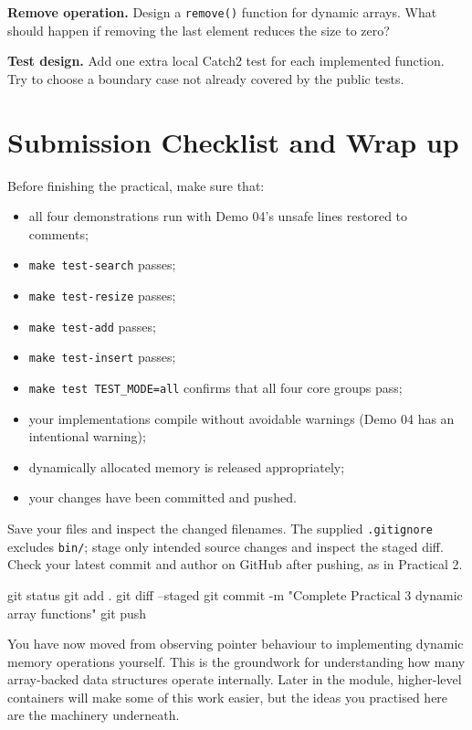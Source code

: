 \documentclass{csc2059practical}
\begin{document}
\begin{challengebox}
\textbf{Remove operation.} Design a \texttt{remove()} function for dynamic arrays. What should happen if removing the last element reduces the size to zero?
\end{challengebox}

\begin{challengebox}
\textbf{Test design.} Add one extra local Catch2 test for each implemented function. Try to choose a boundary case not already covered by the public tests.
\end{challengebox}

\section{Submission Checklist and Wrap up}

Before finishing the practical, make sure that:

\begin{itemize}
  \item all four demonstrations run with Demo 04's unsafe lines restored to comments;
  \item \texttt{make test-search} passes;
  \item \texttt{make test-resize} passes;
  \item \texttt{make test-add} passes;
  \item \texttt{make test-insert} passes;
  \item \texttt{make test TEST\_MODE=all} confirms that all four core groups pass;
  \item your implementations compile without avoidable warnings (Demo 04 has an intentional warning);
  \item dynamically allocated memory is released appropriately;
  \item your changes have been committed and pushed.
\end{itemize}

Save your files and inspect the changed filenames. The supplied \texttt{.gitignore} excludes \texttt{bin/}; stage only intended source changes and inspect the staged diff. Check your latest commit and author on GitHub after pushing, as in Practical 2.

\begin{bashcode}
git status
git add .
git diff --staged
git commit -m "Complete Practical 3 dynamic array functions"
git push
\end{bashcode}

\begin{wrapupbox}
You have now moved from observing pointer behaviour to implementing dynamic memory operations yourself. This is the groundwork for understanding how many array-backed data structures operate internally. Later in the module, higher-level containers will make some of this work easier, but the ideas you practised here are the machinery underneath.
\end{wrapupbox}
\end{document}

